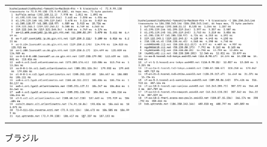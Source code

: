 \documentclass[dvipdfmx,autodetect-engine,titlepage]{jsarticle}
\begin{document}
\begin{figure}[htbp]
\begin{tabular}{cc}
    \begin{minipage}[t]{0.45\hsize}
      \centering
      \includegraphics[keepaspectratio, scale=0.35]{SS7.png}
      \caption{アメリカ東海岸}
    \end{minipage} &
    \begin{minipage}[t]{0.45\hsize}
      \centering
      \includegraphics[keepaspectratio, scale=0.35]{SS8.png}
      \caption{ブラジル}
    \end{minipage}
  \end{tabular}
\end{figure}
\end{document}
